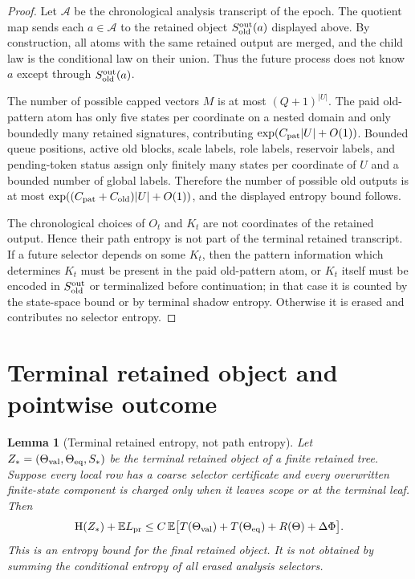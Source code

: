 \documentclass[11pt]{article}
\newtheorem{lemma}[theorem]{Lemma}
\theoremstyle{remark}
\newcommand{\E}{\mathbb E}
\newcommand{\HH}{\mathrm H}
\newcommand{\old}{\mathrm{old}}
\newcommand{\pr}{\mathrm{pr}}
\begin{document}
\begin{proof}
Let $\mathcal A$ be the chronological analysis transcript of the epoch.  The quotient map sends each $a\in\mathcal A$ to the retained object $S_{\old}^{\rm out}(a)$ displayed above.  By construction, all atoms with the same retained output are merged, and the child law is the conditional law on their union.  Thus the future process does not know $a$ except through $S_{\old}^{\rm out}(a)$.

The number of possible capped vectors $M$ is at most $(Q+1)^{|U|}$.  The paid old-pattern atom has only five states per coordinate on a nested domain and only boundedly many retained signatures, contributing $\exp(C_{\rm pat}|U|+O(1))$.  Bounded queue positions, active old blocks, scale labels, role labels, reservoir labels, and pending-token status assign only finitely many states per coordinate of $U$ and a bounded number of global labels.  Therefore the number of possible old outputs is at most $\exp((C_{\rm pat}+C_{\old})|U|+O(1))$, and the displayed entropy bound follows.

The chronological choices of $O_t$ and $K_t$ are not coordinates of the retained output.  Hence their path entropy is not part of the terminal retained transcript.  If a future selector depends on some $K_t$, then the pattern information which determines $K_t$ must be present in the paid old-pattern atom, or $K_t$ itself must be encoded in $S_{\old}^{\rm out}$ or terminalized before continuation; in that case it is counted by the state-space bound or by terminal shadow entropy.  Otherwise it is erased and contributes no selector entropy.
\end{proof}

\section{Terminal retained object and pointwise outcome}

\begin{lemma}[Terminal retained entropy, not path entropy]\label{lem:terminal-retained-not-path}
Let $Z_*=(\Theta_{\rm val},\Theta_{\rm eq},S_*)$ be the terminal retained object of a finite retained tree.  Suppose every local row has a coarse selector certificate and every overwritten finite-state component is charged only when it leaves scope or at the terminal leaf.  Then
\[
        \HH(Z_*)+\E L_{\pr}
        \le C\,\E\bigl[T(\Theta_{\rm val})+T(\Theta_{\rm eq})+R(\Theta)+\Delta\Phi\bigr].
\]
This is an entropy bound for the final retained object.  It is not obtained by summing the conditional entropy of all erased analysis selectors.
\end{lemma}
\end{document}
